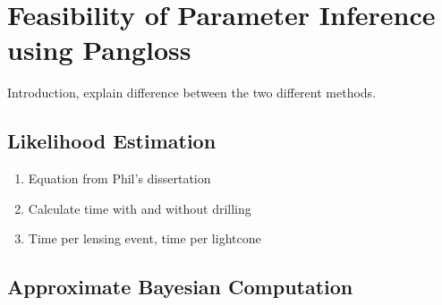 \documentclass[%
 reprint,
 amsmath,amssymb,
 aps,nofootinbib
]{revtex4-1}
\begin{document}

\section{Feasibility of Parameter Inference using Pangloss}

Introduction, explain difference between the two different methods.


\subsection{Likelihood Estimation}

\begin{enumerate}
\item Equation from Phil's dissertation
\item Calculate time with and without drilling
\item Time per lensing event, time per lightcone
\end{enumerate}


\subsection{Approximate Bayesian Computation}
\end{document}

